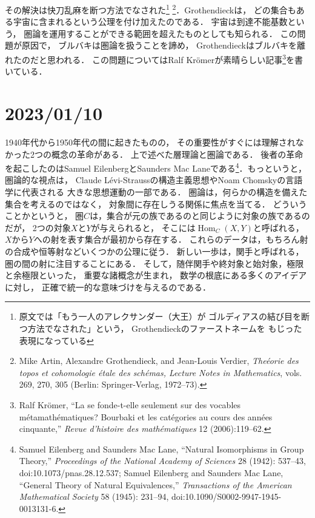 \documentclass[11pt, a4paper, dvipdfmx]{jlreq}
\theoremstyle{definition}
\newcommand{\Hom}{\mathop{\mathrm{Hom}}\nolimits}
\theoremstyle{mystyle}
\numberwithin{equation}{section} %
\begin{document}
\renewcommand{\thefootnote}{[訳注]}
その解決は快刀乱麻を断つ方法でなされた\footnote{
    原文では「もう一人のアレクサンダー（大王）が
    ゴルディアスの結び目を断つ方法でなされた」という，
    Grothendieckのファーストネームを
    もじった表現になっている
}
\renewcommand{\thefootnote}{\arabic{footnote})}
\footnote[7]{
    Mike Artin, Alexandre Grothendieck, and Jean-Louis Verdier, 
    \textit{The\'eorie des topos et 
    cohomologie \'etale des sch\'emas, 
    Lecture Notes in Mathematics}, 
    vols.\,269, 270, 305 (Berlin: Springer-Verlag, 1972--73).
}．Grothendieckは，
どの集合もある宇宙に含まれるという公理を付け加えたのである．
宇宙は到達不能基数という，
圏論を運用することができる範囲を超えたものとしても知られる．
この問題が原因で，
ブルバキは圏論を扱うことを諦め，
Grothendieckはブルバキを離れたのだと思われる．
この問題についてはRalf Kr\"omerが素晴らしい記事\footnote[8]{
    Ralf Kr\"omer, 
    ``La {\fg} 
    se fonde-t-elle seulement sur des vocables 
    m\'etamath\'ematiques? 
    Bourbaki et les cat\'egories au 
    cours des ann\'ees cinquante,'' 
    \textit{Revue d'histoire des math\'ematiques} 12 (2006):119--62.
}を書いている．

\section*{2023/01/10}

1940年代から1950年代の間に起きたものの，
その重要性がすぐには理解されなかった2つの概念の革命がある．
上で述べた層理論と圏論である．
後者の革命を起こしたのはSamuel EilenbergとSaunders Mac Laneである\footnote[9]{
    Samuel Eilenberg and Saunders Mac Lane, 
    ``Natural Isomorphisms in Group Theory,'' 
    \textit{Proceedings of the National Academy of Sciences} 
    28 (1942): 537--43, doi:10.1073/pnas.28.12.537;
    Samuel Eilenberg and Saunders Mac Lane, ``General Theory of Natural Equivalences,'' 
    \textit{Transactions of the American Mathematical Society} 
    58 (1945): 231--94, doi:10.1090/S0002-9947-1945-0013131-6.
}．もっというと，圏論的な視点は，
Claude L\'evi-Straussの構造主義思想やNoam Chomskyの言語学に代表される
大きな思想運動の一部である．
圏論は，何らかの構造を備えた集合を考えるのではなく，
対象間に存在しうる関係に焦点を当てる．
どういうことかというと，
圏$C$は，集合が元の族であるのと同じように対象の族であるのだが，
2つの対象$X$と$Y$が与えられると，
そこには$\Hom_C(X,Y)$と呼ばれる，
$X$から$Y$への射を表す集合が最初から存在する．
これらのデータは，もちろん射の合成や恒等射などいくつかの公理に従う．
新しい一歩は，関手と呼ばれる，圏の間の射に注目することにある．
そして，随伴関手や終対象と始対象，極限と余極限といった，
重要な諸概念が生まれ，
数学の根底にある多くのアイデアに対し，
正確で統一的な意味づけを与えるのである．
\end{document}
